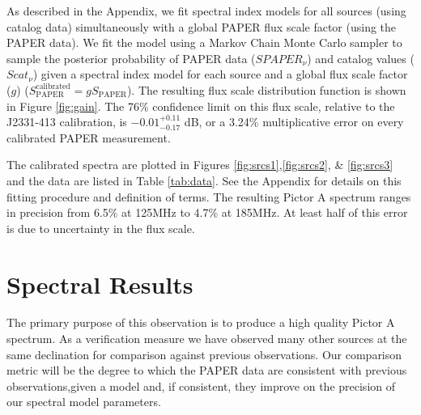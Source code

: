 \documentclass[preprint]{aastex}
\newcommand{\PAPER}{\mathrm{PAPER}}
\begin{document}
As described in the Appendix, we fit spectral index models for all sources
(using catalog data) simultaneously with a global PAPER flux scale factor
(using the PAPER data). We fit the model using a Markov Chain Monte Carlo
sampler to sample the posterior probability of PAPER data ($SPAPER_{\nu}$) and
catalog values ($Scat_{\nu}$) given a spectral index model for each source and
a global flux scale factor ($g$) ($S_\PAPER^\textrm{calibrated} = g S_\PAPER$).
The resulting flux scale distribution function is shown in Figure
\ref{fig:gain}. The 76\% confidence limit on this flux scale, relative to the
J2331-413 calibration, is  $-0.01 ^{+0.11}_{-0.17}$ dB, or a 3.24\%
multiplicative error on every calibrated PAPER measurement.  


The calibrated spectra are plotted in Figures \ref{fig:srcs1},\ref{fig:srcs2},
\& \ref{fig:srcs3} and the data are listed in Table \ref{tab:data}.  See the
Appendix for details on this fitting procedure and definition of terms.  The
resulting Pictor A spectrum ranges in precision from 6.5\% at 125MHz to 4.7\%
at 185MHz. At least half of this error is due to uncertainty in the flux scale.  


 \section{Spectral Results}
 \label{sec:fits}

The primary purpose of this observation is to produce a high quality Pictor A
spectrum. As a verification measure we have observed many other sources at the
same declination for comparison against previous observations.  Our comparison
metric will be the degree to which the PAPER data are consistent with previous
observations,given a model and, if consistent, they improve on the precision of
our spectral model parameters.
\end{document}
